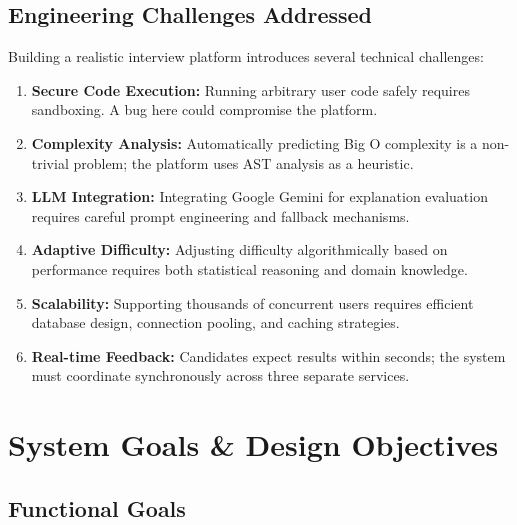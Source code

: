 \documentclass[12pt,a4paper,oneside]{article}
\begin{document}
\subsection{Engineering Challenges Addressed}

Building a realistic interview platform introduces several technical challenges:

\begin{enumerate}
    \item \textbf{Secure Code Execution:} Running arbitrary user code safely requires sandboxing. A bug here could compromise the platform.
    \item \textbf{Complexity Analysis:} Automatically predicting Big O complexity is a non-trivial problem; the platform uses AST analysis as a heuristic.
    \item \textbf{LLM Integration:} Integrating Google Gemini for explanation evaluation requires careful prompt engineering and fallback mechanisms.
    \item \textbf{Adaptive Difficulty:} Adjusting difficulty algorithmically based on performance requires both statistical reasoning and domain knowledge.
    \item \textbf{Scalability:} Supporting thousands of concurrent users requires efficient database design, connection pooling, and caching strategies.
    \item \textbf{Real-time Feedback:} Candidates expect results within seconds; the system must coordinate synchronously across three separate services.
\end{enumerate}

\newpage


\section{System Goals \& Design Objectives}

\subsection{Functional Goals}
\end{document}

